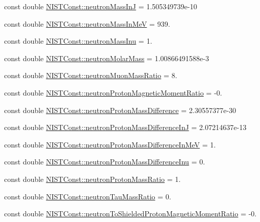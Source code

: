 \begin{DoxyCompactItemize}
\item 
const double \hyperlink{group___neutron_gafebac79241e20d25bca92614d60235e0}{N\+I\+S\+T\+Const\+::neutron\+Mass\+InJ} = 1.\+505349739e-\/10
\item 
const double \hyperlink{group___neutron_gae6642c4b220927894fc213ad0ddf0795}{N\+I\+S\+T\+Const\+::neutron\+Mass\+In\+MeV} = 939.
\item 
const double \hyperlink{group___neutron_ga7931fb41eb5f1acf4b94d9d6b92ca4c3}{N\+I\+S\+T\+Const\+::neutron\+Mass\+Inu} = 1.
\item 
const double \hyperlink{group___neutron_ga0f7ab7fc272f54c17ecf777efff7003b}{N\+I\+S\+T\+Const\+::neutron\+Molar\+Mass} = 1.\+00866491588e-\/3
\item 
const double \hyperlink{group___neutron_ga91ae8b70076ca6001d2141d1df72a39c}{N\+I\+S\+T\+Const\+::neutron\+Muon\+Mass\+Ratio} = 8.
\item 
const double \hyperlink{group___neutron_ga98c2f64e48dbd352a997b82d8815daba}{N\+I\+S\+T\+Const\+::neutron\+Proton\+Magnetic\+Moment\+Ratio} = -\/0.
\item 
const double \hyperlink{group___neutron_ga95ef0427b50433511707f0949fc503b9}{N\+I\+S\+T\+Const\+::neutron\+Proton\+Mass\+Difference} = 2.\+30557377e-\/30
\item 
const double \hyperlink{group___neutron_ga5d980afcad65963a87d9a12b34bfc305}{N\+I\+S\+T\+Const\+::neutron\+Proton\+Mass\+Difference\+InJ} = 2.\+07214637e-\/13
\item 
const double \hyperlink{group___neutron_ga5a4c55b6cb7091d58afd93e77a510526}{N\+I\+S\+T\+Const\+::neutron\+Proton\+Mass\+Difference\+In\+MeV} = 1.
\item 
const double \hyperlink{group___neutron_ga570caff89957976a8486d25e5288df51}{N\+I\+S\+T\+Const\+::neutron\+Proton\+Mass\+Difference\+Inu} = 0.
\item 
const double \hyperlink{group___neutron_gad8a08222b3de2105b5b399faa5a59fbd}{N\+I\+S\+T\+Const\+::neutron\+Proton\+Mass\+Ratio} = 1.
\item 
const double \hyperlink{group___neutron_ga9c3ba7b26cbcc0b2f7f7fa551812683a}{N\+I\+S\+T\+Const\+::neutron\+Tau\+Mass\+Ratio} = 0.
\item 
const double \hyperlink{group___neutron_ga7446ad6eb4c1e0b8167d1a1ff5c4cd89}{N\+I\+S\+T\+Const\+::neutron\+To\+Shielded\+Proton\+Magnetic\+Moment\+Ratio} = -\/0.
\end{DoxyCompactItemize}


